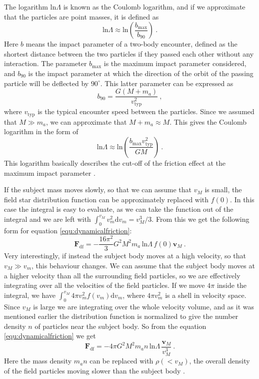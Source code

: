 \documentclass[english, oneside]{HYgradu}
\begin{document}
The logarithm $\mathrm{ln} \Lambda$ is known as the Coulomb logarithm, and if we approximate that the particles are point masses, it is defined as
\begin{equation}
\mathrm{ln} \Lambda \approx \mathrm{ln} \left( \frac{b_{\mathrm{max}}}{b_{90}} \right) \ . \label{equ:coulomblog}
\end{equation}
Here $b$ means the impact parameter of a two-body encounter, defined as the shortest distance between the two particles if they passed each other without any interaction. The parameter $b_{\mathrm{max}}$ is the maximum impact parameter considered, and $b_{90}$ is the impact parameter at which the direction of the orbit of the passing particle will be deflected by $90^{\circ}$. This latter parameter can be expressed as
\begin{equation}
b_{90} = \frac{G(M+m_a)}{v^2_{\mathrm{typ}}} \ ,
\end{equation}
where $v_{\mathrm{typ}}$ is the typical encounter speed between the particles. Since we assumed that $M \gg m_a$, we can approximate that $M+m_a \approx M$. This gives the Coulomb logarithm in the form of
\begin{equation}
\mathrm{ln} \Lambda \approx \mathrm{ln} \left( \frac{b_{\mathrm{max}} v^2_{\mathrm{typ}}}{GM} \right) \ .
\end{equation}
This logarithm basically describes the cut-off of the friction effect at the maximum impact parameter \citep{galform}.

If the subject mass moves slowly, so that we can assume that $v_M$ is small, the field star distribution function can be approximately replaced with $f(0)$. In this case the integral is easy to evaluate, as we can take the function out of the integral and we are left with $\int_0^{v_M} v_m^2 \mathrm{d} v_m = v_M^3/3$. From this we get the following form for equation \eqref{equ:dynamicalfriction}: 
\begin{equation}
\mathbf{F}_{\mathrm{df}} = -\frac{16 \pi^2}{3} G^2 M^2 m_a \, \mathrm{ln} \Lambda \, f(0) \mathbf{v}_M \ . \label{equ:dynfricslow}
\end{equation}
Very interestingly, if instead the subject body moves at a high velocity, so that $v_M \gg v_m$, this behaviour changes. We can assume that the subject body moves at a higher velocity than all the surrounding field particles, so we are effectively integrating over all the velocities of the field particles. If we move $4\pi$ inside the integral, we have $\int_0^{v_M} 4 \pi v_m^2 f(v_m) \mathrm{d}v_m$, where $4 \pi v_m^2$ is a shell in velocity space. Since $v_M$ is large we are integrating over the whole velocity volume, and as it was mentioned earlier the distribution function is normalized to give the number density $n$ of particles near the subject body. So from the equation \eqref{equ:dynamicalfriction} we get
\begin{equation}
\mathbf{F}_{\mathrm{df}} = -4 \pi G^2 M^2 m_a n \, \mathrm{ln} \Lambda \, \frac{\mathbf{v}_M}{v_M^3} \ . \label{equ:dynfricfast}
\end{equation}
Here the mass density $m_a n$ can be replaced with $\rho(< v_M)$, the overall density of the field particles moving slower than the subject body \citep{bt-galdyn}.
\end{document}
